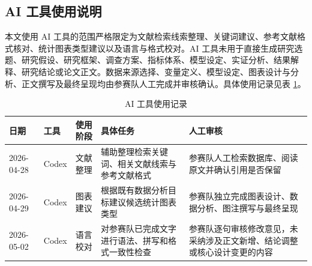 \subsection{AI 工具使用说明}

本文使用 AI 工具的范围严格限定为文献检索线索整理、关键词建议、参考文献格式核对、统计图表类型建议以及语言与格式校对。AI 工具未用于直接生成研究选题、研究假设、研究框架、调查方案、指标体系、模型设定、实证分析、结果解释、研究结论或论文正文。数据来源选择、变量定义、模型设定、图表设计与分析、正文撰写及最终呈现均由参赛队人工完成并审核确认。具体使用记录见表 \ref{tab:ai-usage}。

\begin{table}[H]
  \centering
  \caption{AI 工具使用记录}
  \label{tab:ai-usage}
  \begin{tabular}{@{}p{1.8cm}p{1.2cm}p{1.8cm}p{4.0cm}p{4.0cm}@{}}
    \toprule
    日期 & 工具 & 使用阶段 & 具体任务 & 人工审核 \\
    \midrule
    2026-04-28 & Codex & 文献整理 & 辅助整理检索关键词、相关文献线索与参考文献格式 & 参赛队人工检索数据库、阅读原文并确认引用是否保留 \\
    2026-04-29 & Codex & 图表建议 & 根据既有数据分析目标建议候选统计图表类型 & 参赛队独立完成图表设计、数据分析、图注撰写与最终呈现 \\
    2026-05-02 & Codex & 语言校对 & 对参赛队已完成文字进行语法、拼写和格式一致性检查 & 参赛队逐句审核修改意见，未采纳涉及正文新增、结论调整或核心设计变更的内容 \\
    \bottomrule
  \end{tabular}
\end{table}
